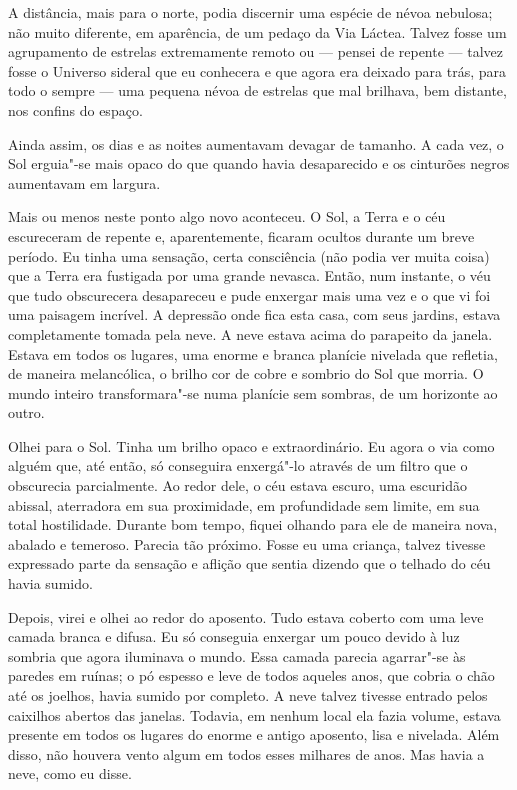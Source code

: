 A distância, mais para o norte, podia discernir uma espécie de névoa nebulosa; não muito diferente, em aparência, de um
pedaço da Via Láctea. Talvez fosse um agrupamento de estrelas extremamente remoto ou --- pensei de repente --- talvez
fosse o Universo sideral que eu conhecera e que agora era deixado para trás, para todo o sempre --- uma pequena névoa de
estrelas que mal brilhava, bem distante, nos confins do espaço.

Ainda assim, os dias e as noites aumentavam devagar de tamanho. A cada vez, o Sol erguia"-se mais opaco do que quando
havia desaparecido e os cinturões negros aumentavam em largura.

Mais ou menos neste ponto algo novo aconteceu. O Sol, a Terra e o céu escureceram de repente e, aparentemente,
ficaram ocultos durante um breve período. Eu tinha uma sensação, certa consciência (não podia ver muita coisa) que a
Terra era fustigada por uma grande nevasca. Então, num instante, o véu que tudo obscurecera desapareceu e pude
enxergar mais uma vez e o que vi foi uma paisagem incrível. A depressão onde fica esta casa, com seus jardins,
estava completamente tomada pela neve. 
A neve estava acima do parapeito da janela. Estava em todos os lugares, uma
enorme e branca planície nivelada que refletia, de maneira melancólica, o brilho cor de cobre e sombrio do Sol que
morria. O mundo inteiro transformara"-se numa planície sem sombras, de um horizonte ao outro.

Olhei para o Sol. Tinha um brilho opaco e extraordinário. Eu agora o via como alguém que, até então, só conseguira
enxergá"-lo através de um filtro que o obscurecia parcialmente. Ao redor dele, o céu estava escuro, uma escuridão
abissal, aterradora em sua proximidade, em profundidade sem limite, em sua total hostilidade. Durante bom tempo,
fiquei olhando para ele de maneira nova, abalado e temeroso. Parecia tão próximo. Fosse eu uma criança, talvez tivesse
expressado parte da sensação e aflição que sentia dizendo que o telhado do céu havia sumido.

Depois, virei e olhei ao redor do aposento. Tudo estava coberto com uma leve camada branca e difusa. Eu
só conseguia enxergar um pouco devido à luz sombria que agora iluminava o mundo. Essa camada parecia agarrar"-se às
paredes em ruínas; o pó espesso e leve de todos aqueles anos, que cobria o chão até os joelhos, havia sumido por
completo. A neve talvez tivesse entrado pelos caixilhos abertos das janelas. Todavia, em nenhum local ela fazia volume,
estava presente em todos os lugares do enorme e antigo aposento, lisa e nivelada. Além disso, não houvera vento algum
em todos esses milhares de anos. Mas havia a neve, como eu disse.

